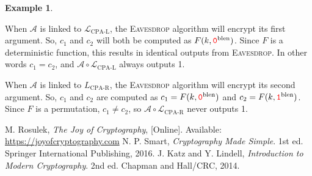 \documentclass[12pt,openany]{book}
\theoremstyle{definition}
\newtheorem{example}{Example}[chapter]
\newcommand{\library}{\mathcal{L}}
\newcommand{\zero}{\textcolor{red}{\texttt{0}}}
\newcommand{\one}{\textcolor{red}{\texttt{1}}}
\begin{document}
\begin{example}
\begin{center}
		\end{center}
	\end{example}
		
	
	
	When \( \mathcal{A} \) is linked to \( \library_{\text{CPA-L}} \), the
	\textsc{Eavesdrop} algorithm will encrypt its first argument. So, \( c_1 \)
	and \( c_2 \) will both be computed as \( F(k, \zero^{\text{blen}}) \). Since \( F \) is a deterministic
	function, this results in identical outputs from \textsc{Eavesdrop}. In
	other words \( c_1 = c_2 \), and \( \mathcal{A} \circ \library_{\text{CPA-L}} \) always outputs 1.
	
	When \( \mathcal{A} \) is linked to \( L_{\text{CPA-R}} \), the
	\textsc{Eavesdrop} algorithm will encrypt its second argument. So,
	\( c_1 \) and \( c_2 \) are computed as \( c_1 = F(k, \zero^{\text{blen}}) \) and \( c_2 = F(k, \one^{\text{blen}}) \).
	Since \( F \) is a permutation, \( c_1 \neq c_2 \), so \( \mathcal{A} \circ \library_{\text{CPA-R}} \) never outputs 1.

	


	\newpage
	\begin{thebibliography}{9}
		M. Rosulek, \textit{The Joy of Cryptography}, [Online]. Available: \url{https://joyofcryptography.com}
		N. P. Smart, \textit{Cryptography Made Simple}. 1st ed. Springer International Publishing, 2016.
		J. Katz and Y. Lindell, \textit{Introduction to Modern Cryptography}. 2nd ed. Chapman and Hall/CRC, 2014.	
\end{thebibliography}

\end{document}
